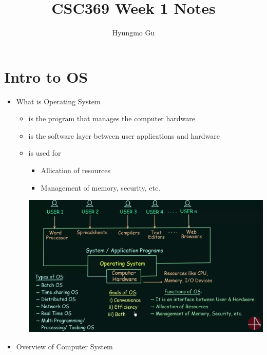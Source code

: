 \documentclass[12pt]{article}
\begin{document}
\title{CSC369 Week 1 Notes}
\author{Hyungmo Gu}
\maketitle

\section{Intro to OS}

\bigskip

\begin{itemize}
    \item What is Operating System
    \begin{itemize}
        \item is the program that manages the computer hardware
        \item is the software layer between user applications and hardware
        \item is used for
        \begin{itemize}
            \item Allication of resources
            \item Management of memory, security, etc.
        \end{itemize}

        \begin{center}
        \includegraphics[width=\linewidth]{images/week_1_notes_1_1.png}
        \end{center}
    \end{itemize}
    \item Overview of Computer System

    \bigskip


\end{itemize}
\end{document}
